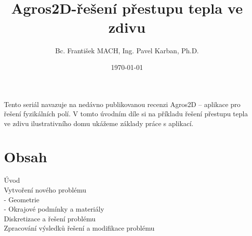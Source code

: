 \documentclass[a4paper, oneside]{article}
\begin{document}
\author{Bc. František MACH, Ing. Pavel Karban, Ph.D.}
\date{\today}
\title{Agros2D-řešení přestupu tepla ve zdivu}
\maketitle
Tento seriál navazuje na nedávno publikovanou recenzi Agros2D – aplikace pro řešení fyzikálních polí. V tomto úvodním díle si na příkladu řešení přestupu tepla ve zdivu ilustrativního domu ukážeme základy práce s aplikací.
\section{Obsah}
Úvod\\
Vytvoření nového problému\\
 - Geometrie\\
 - Okrajové podmínky a materiály\\
Diskretizace a řešení problému\\
Zpracování výsledků řešení a modifikace problému\\
\end{document}
